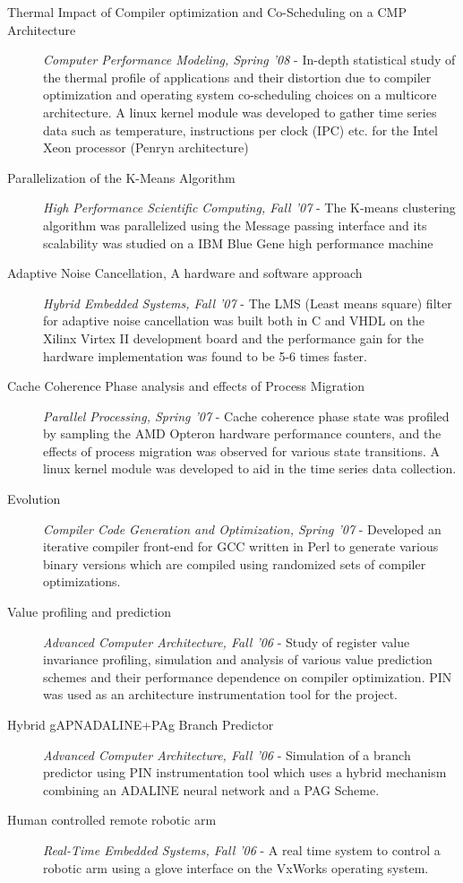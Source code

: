 
\begin{description}
\item[Thermal Impact of Compiler optimization and Co-Scheduling on a CMP Architecture]
\textit{Computer Performance Modeling, Spring '08} - In-depth statistical study of the thermal profile of applications and their distortion due to compiler optimization and operating system co-scheduling choices on a multicore architecture. A linux kernel module was developed to gather time series data such as temperature, instructions per clock (IPC) etc. for the Intel Xeon processor (Penryn architecture)

\item[Parallelization of the K-Means Algorithm]
\textit{High Performance Scientific Computing, Fall '07} - The K-means clustering algorithm was parallelized using the Message passing interface and its scalability was studied on a IBM Blue Gene high performance machine

\item[Adaptive Noise Cancellation, A hardware and software approach]
\textit{Hybrid Embedded Systems, Fall '07} - The LMS (Least means square) filter for adaptive noise cancellation was built both in C and VHDL on the Xilinx Virtex II development board and the performance gain for the hardware implementation was found to be 5-6 times faster.

\item[Cache Coherence Phase analysis and effects of Process Migration]
\textit{Parallel Processing, Spring '07} - Cache coherence phase state was profiled by sampling the AMD Opteron hardware performance counters, and the effects of process migration was observed for various state transitions. A linux kernel module was developed to aid in the time series data collection.

\item[Evolution]
\textit{Compiler Code Generation and Optimization, Spring '07} - Developed an iterative compiler front-end for GCC written in Perl to generate various binary versions which are compiled using randomized sets of compiler optimizations.

\item[Value profiling and prediction]
\textit{Advanced Computer Architecture, Fall '06} - Study of register value invariance profiling, simulation and analysis of various value prediction schemes and their performance dependence on compiler optimization. PIN was used as an architecture instrumentation tool for the project.

\item[Hybrid gAPNADALINE+PAg Branch Predictor]
\textit{Advanced Computer Architecture, Fall '06} - Simulation of a branch predictor using PIN instrumentation tool which uses a hybrid mechanism combining an ADALINE neural network and a PAG Scheme.

\item[Human controlled remote robotic arm]
\textit{Real-Time Embedded Systems, Fall '06} - A real time system to control a robotic arm using a glove interface on the VxWorks operating system.
\end{description}

